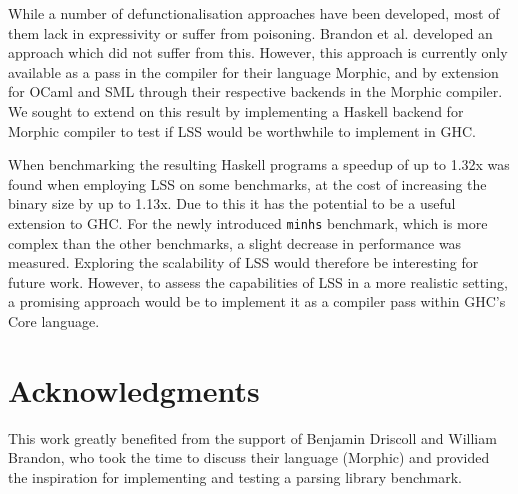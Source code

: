 \documentclass[a4paper,UKenglish,cleveref, autoref, thm-restate]{template/lipics-v2021}
\newcommand{\lss}{LSS\xspace}
\newcommand{\ghc}{GHC\xspace}
\begin{document}
While a number of defunctionalisation approaches have been developed, most of them lack in expressivity or suffer from poisoning. Brandon et al.\cite{brandon2023better} developed an approach which did not suffer from this. However, this approach is currently only available as a pass in the compiler for their language Morphic, and by extension for OCaml and SML through their respective backends in the Morphic compiler. We sought to extend on this result by implementing a Haskell backend for Morphic compiler to test if \lss would be worthwhile to implement in \ghc.

When benchmarking the resulting Haskell programs a speedup of up to 1.32x was found when employing \lss on some benchmarks, at the cost of increasing the binary size by up to 1.13x. Due to this it has the potential to be a useful extension to \ghc. For the newly introduced \texttt{minhs} benchmark, which is more complex than the other benchmarks, a slight decrease in performance was measured. Exploring the scalability of LSS would therefore be interesting for future work. However, to assess the capabilities of LSS in a more realistic setting, a promising approach would be to implement it as a compiler pass within GHC's Core language.





\section*{Acknowledgments}
This work greatly benefited from the support of Benjamin Driscoll and William Brandon, who took the time to discuss their language (Morphic) and provided the inspiration for implementing and testing a parsing library benchmark.
\end{document}
